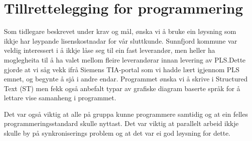 \chapter{Tillrettelegging for programmering}
\thispagestyle{fancy}
\label{sec:5} 

Som tidlegare beskrevet under krav og mål, ønska vi å bruke ein løysning som ikkje har løypande lisenskostnadar for vår sluttkunde. 
Sunnfjord kommune var veldig interessert i å ikkje låse seg til ein fast leverandør, men heller ha moglegheita til å ha valet mellom fleire 
leverandørar innan levering av PLS.Dette gjorde at vi såg vekk ifrå Siemens TIA-portal som vi hadde lært
igjennom PLS emnet, og begynte å sjå i andre endar.
Programmet ønska vi å skrive i Structured Text (ST) men fekk også anbefalt typar av grafiske diagram baserte språk for å lettare
vise samanheng i programmet.

Det var også viktig at alle på gruppa kunne programmere samtidig og at ein felles programmeringsstandard skulle nyttast.
Det var viktig at parallelt arbeid ikkje skulle by på synkroniserings problem og at det var ei god løysning for dette.


